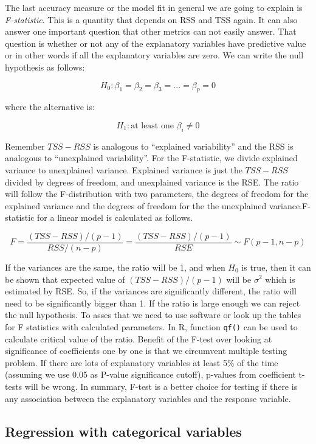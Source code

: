 \documentclass[12pt,]{krantz}
\begin{document}
The last accuracy measure or the model fit in general we are going to explain is \emph{F-statistic}. This is a quantity that depends on RSS and TSS again. It can also answer one important question that other metrics can
not easily answer. That question is whether or not any of the explanatory
variables have predictive value or in other words if all the explanatory variables are zero. We can write the null hypothesis as follows:

\[H_0: \beta_1=\beta_2=\beta_3=...=\beta_p=0 \]

where the alternative is:

\[H_1: \text{at least one } \beta_i \neq 0 \]

Remember \(TSS-RSS\) is analogous to ``explained variability'' and the RSS is
analogous to ``unexplained variability''. For the F-statistic, we divide explained variance to
unexplained variance. Explained variance is just the \(TSS-RSS\) divided
by degrees of freedom, and unexplained variance is the RSE.
The ratio will follow the F-distribution
with two parameters, the degrees of freedom for the explained variance and
the degrees of freedom for the the unexplained variance.F-statistic for a linear model is calculated as follows.

\[F=\frac{(TSS-RSS)/(p-1)}{RSS/(n-p)}=\frac{(TSS-RSS)/(p-1)}{RSE} \sim F(p-1,n-p)\]

If the variances are the same, the ratio will be 1, and when \(H_0\) is true, then
it can be shown that expected value of \((TSS-RSS)/(p-1)\) will be \(\sigma^2\)
which is estimated by RSE. So, if the variances are significantly different,
the ratio will need to be significantly bigger than 1.
If the ratio is large enough we can reject the null hypothesis. To asses that
we need to use software or look up the tables for F statistics with calculated
parameters. In R, function \texttt{qf()} can be used to calculate critical value of the
ratio. Benefit of the F-test over
looking at significance of coefficients one by one is that we circumvent
multiple testing problem. If there are lots of explanatory variables
at least 5\% of the time (assuming we use 0.05 as P-value significance
cutoff), p-values from coefficient t-tests will be wrong. In summary,
F-test is a better choice for testing if there is any association
between the explanatory variables and the response variable.

\hypertarget{regression-with-categorical-variables}{%
\subsection{Regression with categorical variables}\label{regression-with-categorical-variables}}
\end{document}
